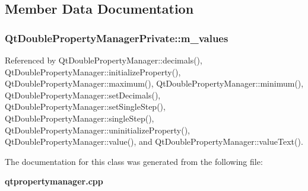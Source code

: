 \subsection{Member Data Documentation}
\subsubsection[{m\+\_\+values}]{ Qt\+Double\+Property\+Manager\+Private\+::m\+\_\+values}\label{classQtDoublePropertyManagerPrivate_af5edc39fbedaa3589e7c7ee6d038cc78}


Referenced by Qt\+Double\+Property\+Manager\+::decimals(), Qt\+Double\+Property\+Manager\+::initialize\+Property(), Qt\+Double\+Property\+Manager\+::maximum(), Qt\+Double\+Property\+Manager\+::minimum(), Qt\+Double\+Property\+Manager\+::set\+Decimals(), Qt\+Double\+Property\+Manager\+::set\+Single\+Step(), Qt\+Double\+Property\+Manager\+::single\+Step(), Qt\+Double\+Property\+Manager\+::uninitialize\+Property(), Qt\+Double\+Property\+Manager\+::value(), and Qt\+Double\+Property\+Manager\+::value\+Text().



The documentation for this class was generated from the following file\+:\begin{DoxyCompactItemize}
\item 
{\bf qtpropertymanager.\+cpp}\end{DoxyCompactItemize}
